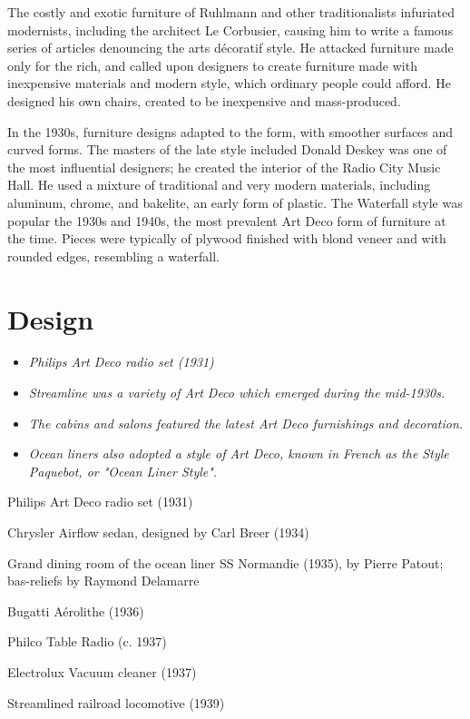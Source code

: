 The costly and exotic furniture of Ruhlmann and other traditionalists
infuriated modernists, including the architect Le Corbusier, causing him
to write a famous series of articles denouncing the arts décoratif
style. He attacked furniture made only for the rich, and called upon
designers to create furniture made with inexpensive materials and modern
style, which ordinary people could afford. He designed his own chairs,
created to be inexpensive and mass-produced.

In the 1930s, furniture designs adapted to the form, with smoother
surfaces and curved forms. The masters of the late style included Donald
Deskey was one of the most influential designers; he created the
interior of the Radio City Music Hall. He used a mixture of traditional
and very modern materials, including aluminum, chrome, and bakelite, an
early form of plastic. The Waterfall style was popular the 1930s and
1940s, the most prevalent Art Deco form of furniture at the time. Pieces
were typically of plywood finished with blond veneer and with rounded
edges, resembling a waterfall.

\section{Design}\label{design}

\begin{itemize}
\item
  \emph{Philips Art Deco radio set (1931)}
\item
  \emph{Streamline was a variety of Art Deco which emerged during the
  mid-1930s.}
\item
  \emph{The cabins and salons featured the latest Art Deco furnishings
  and decoration.}
\item
  \emph{Ocean liners also adopted a style of Art Deco, known in French
  as the Style Paquebot, or "Ocean Liner Style".}
\end{itemize}

Philips Art Deco radio set (1931)

Chrysler Airflow sedan, designed by Carl Breer (1934)

Grand dining room of the ocean liner SS Normandie (1935), by Pierre
Patout; bas-reliefs by Raymond Delamarre

Bugatti Aérolithe (1936)

Philco Table Radio (c. 1937)

Electrolux Vacuum cleaner (1937)

Streamlined railroad locomotive (1939)

